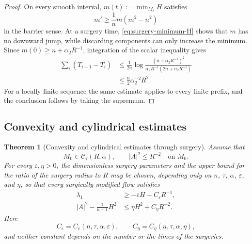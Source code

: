 \documentclass[11pt,reqno]{amsart}
\newtheorem{theorem}[proposition]{Theorem}
\theoremstyle{definition}
\theoremstyle{remark}
\numberwithin{equation}{section}
\newcommand{\CC}{\mathcal C}
\begin{document}
\begin{proof}
  On every smooth interval, $m(t):=\min_{M_t}H$ satisfies  
  \begin{equation*}
  m'   \geq 
  \frac1n m(m^2-n^2)
  \end{equation*}
 in the barrier sense.  At a surgery time, \eqref{eq:surgery-minimum-H} shows that $m$ has no
  downward jump, while discarding components can only increase the minimum.
  Since $m(0)\geq n+\alpha_2R^{-1}$,  
  integration of the scalar inequality gives
  \begin{align*}
    \sum_i(T_{i+1}-T_i)
    &\leq
    \frac1{2n}
    \log
    \frac{(n+\alpha_2R^{-1})^2}
    {\alpha_2R^{-1}(2n+\alpha_2R^{-1})}\\
    &\leq
    \frac n2\alpha_2^{-2}R^2.
  \end{align*}
  For a locally finite sequence the same estimate applies to every finite
  prefix, and the conclusion follows by taking the supremum.
\end{proof}


\subsection{Convexity and cylindrical estimates}

\begin{theorem}[Convexity and cylindrical estimates through surgery]
  \label{thm:surgical-cylindrical-estimates}
  Assume that
  \begin{equation*}
  M_0\in\CC_\tau(R,\alpha),
  \qquad
  |A|^2\leq R^{-2}\quad\text{on }M_0.
  \end{equation*}
 For every $\varepsilon,\eta>0$, the dimensionless surgery parameters and the
  upper bound for the ratio of the surgery radius to $R$ may be chosen,
  depending only on   $n$, $\tau$, $\alpha$, $\varepsilon$, and $\eta$, so that every   surgically modified flow satisfies
  \begin{align}
    \lambda_1
    &\geq
    -\varepsilon H-C_\varepsilon R^{-1},
    \label{eq:surgical-convexity}\\
    |A|^2-\frac1{n-1}H^2
    &\leq
    \eta H^2+C_\eta R^{-2}.
    \label{eq:surgical-cylindrical}
  \end{align}
  Here
  \begin{equation*}
  C_\varepsilon
  =C_\varepsilon(n,\tau,\alpha,\varepsilon),
  \qquad
  C_\eta
  =C_\eta(n,\tau,\alpha,\eta),
  \end{equation*}
  and neither constant depends on the number or the times of the surgeries.
\end{theorem}
\end{document}
